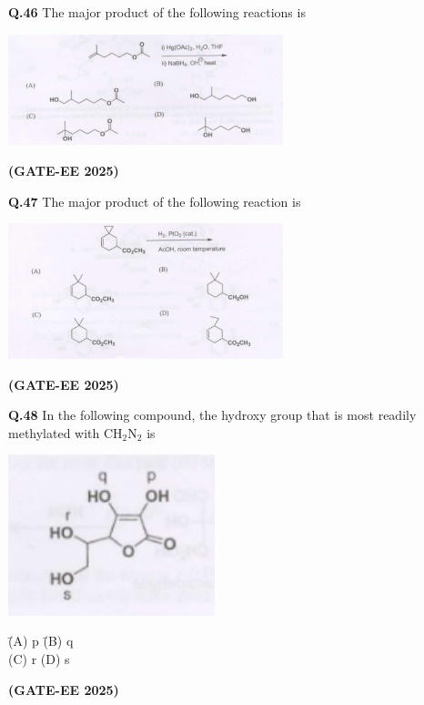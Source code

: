 \documentclass[12pt]{article}
\begin{document}
\begin{enumerate}
\vspace{0.5cm}

\textbf{Q.46} The major product of the following reactions is

\begin{center}
\includegraphics[width=0.6\textwidth]{q46.png}
\end{center}   \textbf{(GATE-EE 2025)}


\vspace{0.5cm}

\textbf{Q.47} The major product of the following reaction is

\begin{center}
\includegraphics[width=0.6\textwidth]{q47.png}
\end{center}   \textbf{(GATE-EE 2025)}


\vspace{0.5cm}

\textbf{Q.48} \quad In the following compound, the hydroxy group that is most readily methylated with CH$_2$N$_2$ is

\begin{center}
\includegraphics[width=0.45\textwidth]{q48.png}
\end{center}

\begin{tabbing}
\hspace{1cm} \= (A) p \hspace{2cm} \= (B) q \\
\> (C) r \> (D) s
\end{tabbing}   \textbf{(GATE-EE 2025)}



\end{enumerate}
\end{document}

